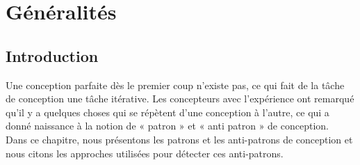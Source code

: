
\chapter{Généralités}
\section{Introduction}
Une conception parfaite dès le premier coup n’existe pas, ce qui fait de la tâche de conception une tâche itérative. Les concepteurs avec l’expérience ont remarqué qu’il y a quelques choses qui se répètent d’une conception à l’autre, ce qui a donné naissance à la notion de « patron » et « anti patron » de conception.
\vspace{5px}\\
Dans ce chapitre, nous présentons les patrons et les anti-patrons de conception et nous citons les approches utilisées pour détecter ces anti-patrons.

